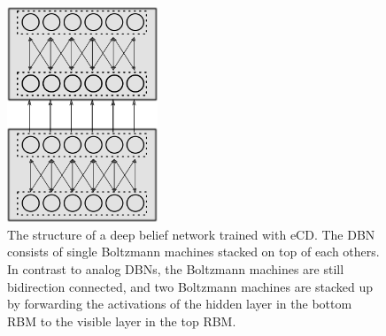 \begin{figure}
	\centering
    	\includegraphics[width=0.4\textwidth]{imgs/spike_dbm.png} 
    \caption{The structure of a deep belief network trained with eCD. The DBN consists of single Boltzmann machines stacked on top of each others. In contrast to analog DBNs, the Boltzmann machines are still bidirection connected, and two Boltzmann machines are stacked up by forwarding the activations of the hidden layer in the bottom RBM to the visible layer in the top RBM.}
	\label{fig:spikedbn}
\end{figure}

